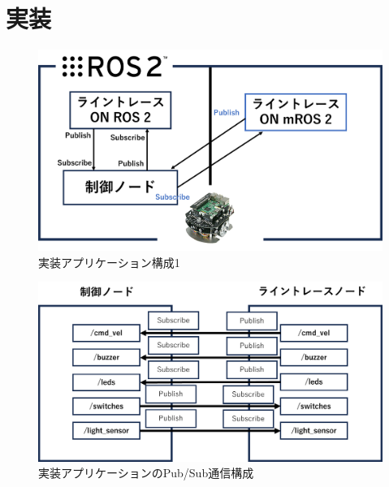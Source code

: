 \chapter{実装}
\begin{figure}[ht]
    \centering
    \includegraphics[width=15cm]{images/fig4_raspimouse_configuration.png}
    \caption{実装アプリケーション構成1}
    \label{fig:mros2_ros2_raspimouse_configuration}
\end{figure}
\begin{figure}[h]
    \centering
    \includegraphics[width=15cm]{images/fig4_pubsub_configuration.png}
    \caption{実装アプリケーションのPub/Sub通信構成}
    \label{fig:mros2_ros2_pubsub_configuration}
\end{figure}

